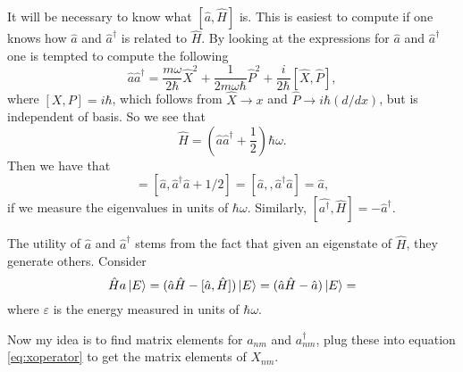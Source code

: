 \documentclass{article}
\begin{document}
It will be necessary to know what $[\hat{a},\hat{H}]$ is. This is easiest to compute if one knows how $\hat{a}$ and $\hat{a}^{\dagger}$ is related to $\hat{H}$. By looking at the expressions for $\hat{a}$ and $\hat{a}^{\dagger}$ one is tempted to compute the following
\begin{equation*}
\hat{a}\hat{a}^{\dagger}=\frac{m\omega}{2\hbar}\hat{X}^2+\frac{1}{2m\omega\hbar}\hat{P}^2+\frac{i}{2\hbar}[\hat{X},\hat{P}],
\end{equation*}
where $[X,P]=i\hbar$, which follows from $\hat{X}\rightarrow x$ and $\hat{P}\rightarrow i\hbar (d/dx)$, but is independent of basis. So we see that
\begin{equation}
\hat{H} = (\hat{a}\hat{a}^{\dagger}+\frac{1}{2})\hbar\omega.
\end{equation}
Then we have that 
\begin{equation}
[\hat{a},\hat{H}] = [\hat{a},\hat{a}^{\dagger}\hat{a}+1/2]=[\hat{a},,\hat{a}^{\dagger}\hat{a}] = \hat{a},
\end{equation}
if we measure the eigenvalues in units of $\hbar\omega$. Similarly, $[\hat{a^{\dagger}},\hat{H}]=-\hat{a}^{\dagger}$.

The utility of $\hat{a}$ and $\hat{a}^{\dagger}$ stems from the fact that given an eigenstate of $\hat{H}$, they generate others. Consider
\begin{equation}
\label{eq:neweigenvalues}
\hat{H}a\ket{E}=(\hat{a}\hat{H}-[\hat{a},\hat{H}])\ket{E}=(\hat{a}\hat{H}-\hat{a})\ket{E}=
\end{equation}
where $\varepsilon$ is the energy measured in units of $\hbar\omega$.

Now my idea is to find matrix elements for $a_{nm}$ and $a^{\dagger}_{nm}$, plug these into equation \ref{eq:xoperator} to get the matrix elements of $X_{nm}$.
\end{document}
